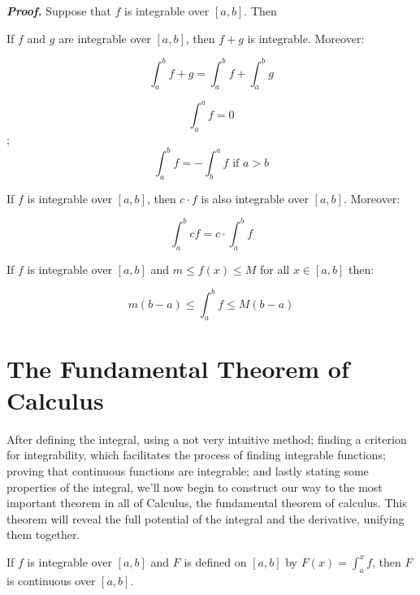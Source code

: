 \documentclass{report}
\begin{document}

    \textit{\textbf{Proof.}} Suppose that $f$ is integrable over $[a,b]$. Then 

    \begin{thBox}
        If $f$ and $g$ are integrable over $[a,b]$, then $f+g$ is integrable. Moreover:

        $$\int_{a}^{b}f+g = \int_{a}^{b}f + \int_{a}^{b}g$$
    \end{thBox}

    \begin{defBox}
        $$\int_{a}^{a}f = 0$$;
        $$\int_{a}^{b}f = - \int_{b}^{a}f \text{ if } a> b$$
    \end{defBox}

    \begin{thBox}
        If $f$ is integrable over $[a,b]$, then $c\cdot f$ is also integrable over $[a,b]$. Moreover:

        $$\int_{a}^{b}cf = c\cdot \int_{a}^{b}f$$
    \end{thBox}

    \begin{thBox}
        If $f$ is integrable over $[a,b]$ and $m\leq f(x) \leq M$ for all $x \in [a,b]$ then:

        $$m(b-a) \leq \int_{a}^{b}f \leq M(b-a)$$
    \end{thBox}


    \section{The Fundamental Theorem of Calculus}

    After defining the integral, using a not very intuitive method; finding a criterion for integrability, which facilitates the process of finding integrable functions; proving that continuous functions are integrable; and lastly stating some properties of the integral, we'll now begin to construct our way to the most important theorem in all of Calculus, the fundamental theorem of calculus. This theorem will reveal the full potential of the integral and the derivative, unifying them together.

    \begin{thBox}
        If $f$ is integrable over $[a,b]$ and $F$ is defined on $[a,b]$ by $F(x) = \int_{a}^{x}f$, then $F$ is continuous over $[a,b]$.
    \end{thBox}

\end{document}
